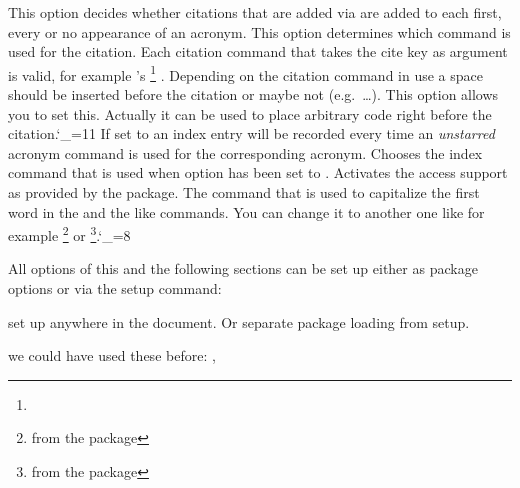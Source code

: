 \documentclass[DIV10,toc=index,toc=bib,hyperfootnotes=false]{cnpkgdoc}
\makeatletter
\providecommand*\sinceversion[1]{%
  \@bsphack
  \marginnote{%
    \footnotesize\sffamily\RaggedRight
    \textcolor{black!75}{Introduced in version~#1}}%
  \@esphack}
\makeatother
\begin{document}
\begin{beschreibung}
   This option decides whether citations that are added via 
   are added to each first, every or no appearance of an acronym.
   This option determines which command is used for the citation. Each citation
   command that takes the cite key as argument is valid, for example 's%
   \footnote{} .
   Depending on the citation command in use a space should be inserted before the
   citation or maybe not (e.g.\ \ldots). This option allows you to
   set this. Actually it can be used to place arbitrary code right before the
   citation.\catcode`\_=11
   \sinceversion{1.1}If set to  an index entry will be recorded
   every time an \emph{unstarred} acronym command is used for the corresponding
   acronym.
   \sinceversion{1.1}Chooses the index command that is used when option 
   has been set to .
   \sinceversion{1.0}Activates the access support as provided by the 
    package.
   The command that is used to capitalize the first word in the  and the
   like commands. You can change it to another one like for example
   \footnote{from the  package} or
   \footnote{from the  package}.\catcode`\_=8
\end{beschreibung}

All options of this and the following sections can be set up either as package
options or via the setup command:
\begin{beschreibung}
 \newline
   set up \acro anywhere in the document. Or separate package loading from setup.
\end{beschreibung}

\begin{beispiel}
 we could have used these before: \nato, \ny
\end{beispiel}
\end{document}
